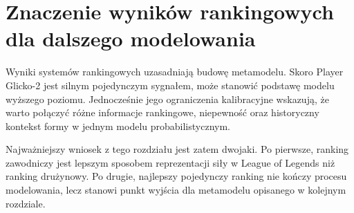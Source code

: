 \section{Znaczenie wyników rankingowych dla dalszego modelowania}

Wyniki systemów rankingowych uzasadniają budowę metamodelu. Skoro Player Glicko-2 jest silnym pojedynczym sygnałem, może stanowić podstawę modelu wyższego poziomu. Jednocześnie jego ograniczenia kalibracyjne wskazują, że warto połączyć różne informacje rankingowe, niepewność oraz historyczny kontekst formy w jednym modelu probabilistycznym.

Najważniejszy wniosek z tego rozdziału jest zatem dwojaki. Po pierwsze, ranking zawodniczy jest lepszym sposobem reprezentacji siły w League of Legends niż ranking drużynowy. Po drugie, najlepszy pojedynczy ranking nie kończy procesu modelowania, lecz stanowi punkt wyjścia dla metamodelu opisanego w kolejnym rozdziale.
